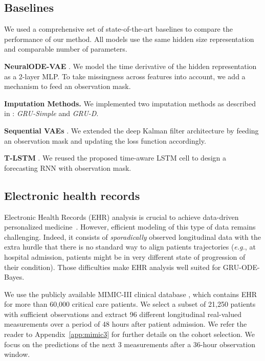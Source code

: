 \documentclass{article}
\begin{document}
\subsection{Baselines}

We used a comprehensive set of state-of-the-art baselines to compare the performance of our method. All models use the same hidden size representation and comparable number of parameters.

\textbf{NeuralODE-VAE} \citep{neural_ode}. We model the time derivative of the hidden representation as a 2-layer MLP. To take missingness across features into account, we add a mechanism to feed an observation mask.

\textbf{Imputation Methods.} We implemented two imputation methods as described in \citet{che2018recurrent}: \emph{GRU-Simple} and \emph{GRU-D}. 

\textbf{Sequential VAEs} \citep{krishnan2015deep,krishnan2017structured}. We extended the deep Kalman filter architecture by feeding an observation mask and updating the loss function accordingly.

\textbf{T-LSTM} \citep{baytas2017patient}. We reused the proposed time-aware LSTM cell to design a forecasting RNN with observation mask.

\subsection{Electronic health records}
Electronic Health Records (EHR) analysis is crucial to achieve data-driven personalized medicine~\citep{lee2017big,goldstein2017opportunities,esteva2019guide}. However, efficient modeling of this type of data remains challenging. Indeed, it consists of \emph{sporadically} observed longitudinal data with the extra hurdle that there is no standard way to align patients trajectories (\emph{e.g.}, at hospital admission, patients might be in very different state of progression of their condition). Those difficulties make EHR analysis well suited for GRU-ODE-Bayes.

We use the publicly available MIMIC-III clinical database \citep{johnson2016mimic}, which contains EHR for more than 60,000 critical care patients. We select a subset of 21,250 patients with sufficient observations and extract 96 different longitudinal real-valued measurements over a period of 48 hours after patient admission. We refer the reader to Appendix~\ref{app:mimic3} for further details on the cohort selection. We focus on the predictions of the next 3 measurements after a 36-hour observation window. 
\end{document}
